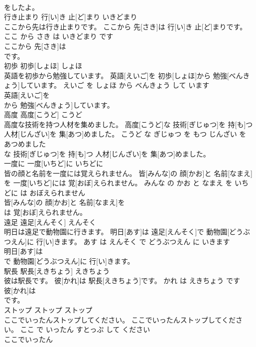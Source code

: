 \documentclass[8pt]{extreport}
\begin{document}
\begin{CJK}{UTF8}{min}
\\	をしたよ。			
\\	行き止まり	行[い]き 止[ど]まり	いきどまり	
\\	ここから先は行き止まりです。	ここから 先[さき]は 行[い]き 止[ど]まりです。	ここ から さき は いきどまり です	
\\	ここから 先[さき]は
\\	です。			
\\	初歩	初歩[しょほ]	しょほ	
\\	英語を初歩から勉強しています。	英語[えいご]を 初歩[しょほ]から 勉強[べんきょう]しています。	えいご を しょほ から べんきょう して います	
\\	英語[えいご]を
\\	から 勉強[べんきょう]しています。			
\\	高度	高度[こうど]	こうど	
\\	高度な技術を持つ人材を集めました。	高度[こうど]な 技術[ぎじゅつ]を 持[も]つ 人材[じんざい]を 集[あつ]めました。	こうど な ぎじゅつ を もつ じんざい を あつめました	
\\	な 技術[ぎじゅつ]を 持[も]つ 人材[じんざい]を 集[あつ]めました。			
\\	一度に	一度[いちど]に	いちどに	
\\	皆の顔と名前を一度には覚えられません。	皆[みんな]の 顔[かお]と 名前[なまえ]を 一度[いちど]には 覚[おぼ]えられません。	みんな の かお と なまえ を いちどに は おぼえられません	
\\	皆[みんな]の 顔[かお]と 名前[なまえ]を
\\	は 覚[おぼ]えられません。			
\\	遠足	遠足[えんそく]	えんそく	
\\	明日は遠足で動物園に行きます。	明日[あす]は 遠足[えんそく]で 動物園[どうぶつえん]に 行[い]きます。	あす は えんそく で どうぶつえん に いきます	
\\	明日[あす]は
\\	で 動物園[どうぶつえん]に 行[い]きます。			
\\	駅長	駅長[えきちょう]	えきちょう	
\\	彼は駅長です。	彼[かれ]は 駅長[えきちょう]です。	かれ は えきちょう です	
\\	彼[かれ]は
\\	です。			
\\	ストップ	ストップ	ストップ	
\\	ここでいったんストップしてください。	ここでいったんストップしてください。	ここ で いったん すとっぷ して ください	
\\	ここでいったん

\end{CJK}
\end{document}
